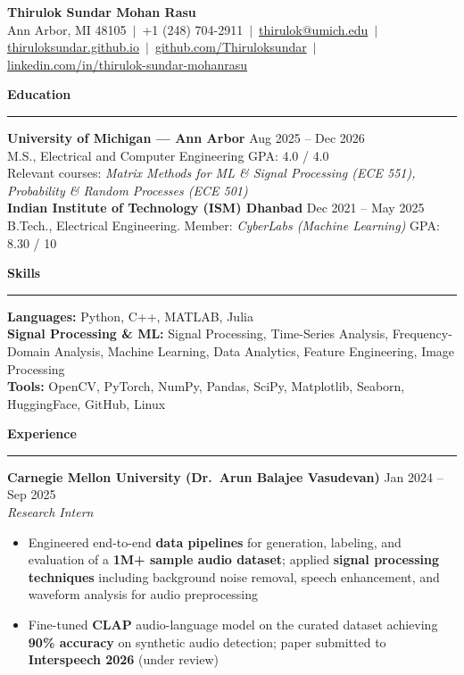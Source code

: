 \documentclass[9pt]{article}
\newcommand{\sect}[1]{\vspace{4pt}\noindent\textbf{\large #1}\vspace{3pt}\hrule\vspace{6pt}}
\begin{document}
\begin{center}
  {\Large \textbf{Thirulok Sundar Mohan Rasu}}\\[3pt]
  Ann Arbor, MI 48105 $\,|\,$ +1 (248) 704-2911 $\,|\,$
  \href{mailto:thirulok@umich.edu}{thirulok@umich.edu} $\,|\,$
  \href{https://thiruloksundar.github.io}{thiruloksundar.github.io} $\,|\,$
  \href{https://github.com/Thiruloksundar}{github.com/Thiruloksundar} $\,|\,$
  \href{https://www.linkedin.com/in/thirulok-sundar-mohanrasu/}{linkedin.com/in/thirulok-sundar-mohanrasu}
\end{center}
\vspace{-3mm}

\sect{Education}
\textbf{University of Michigan --- Ann Arbor} \hfill Aug 2025 -- Dec 2026\\
M.S., Electrical and Computer Engineering \hfill GPA: 4.0 / 4.0\\
Relevant courses: \emph{Matrix Methods for ML \& Signal Processing (ECE 551), Probability \& Random Processes (ECE 501)}\\[5pt]
\textbf{Indian Institute of Technology (ISM) Dhanbad} \hfill Dec 2021 -- May 2025\\
B.Tech., Electrical Engineering. Member: \emph{CyberLabs (Machine Learning)} \hfill GPA: 8.30 / 10

\sect{Skills}
\textbf{Languages:} Python, C++, MATLAB, Julia\\
\textbf{Signal Processing \& ML:} Signal Processing, Time-Series Analysis, Frequency-Domain Analysis, Machine Learning, Data Analytics, Feature Engineering, Image Processing\\
\textbf{Tools:} OpenCV, PyTorch, NumPy, Pandas, SciPy, Matplotlib, Seaborn, HuggingFace, GitHub, Linux

\sect{Experience}

\textbf{Carnegie Mellon University (Dr.\ Arun Balajee Vasudevan)} \hfill Jan 2024 -- Sep 2025\\
\emph{Research Intern}
\vspace{-2mm}
\begin{itemize}[leftmargin=*,noitemsep,topsep=1pt]
  \item Engineered end-to-end \textbf{data pipelines} for generation, labeling, and evaluation of a \textbf{1M+ sample audio dataset}; applied \textbf{signal processing techniques} including background noise removal, speech enhancement, and waveform analysis for audio preprocessing
  \item Fine-tuned \textbf{CLAP} audio-language model on the curated dataset achieving \textbf{90\% accuracy} on synthetic audio detection; paper submitted to \textbf{Interspeech 2026} (under review)
\end{itemize}
\end{document}
